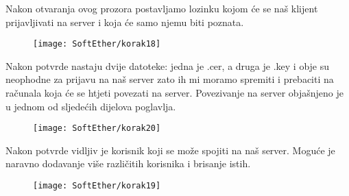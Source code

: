 \FloatBarrier
Nakon otvaranja ovog prozora postavljamo lozinku kojom će se naš klijent prijavljivati na server i koja će samo njemu biti poznata.
\begin{figure}[h!]
     \centering
     \texttt{[image: SoftEther/korak18]}
\end{figure}
\FloatBarrier
Nakon potvrde nastaju dvije datoteke: jedna je .cer, a druga je .key i obje su neophodne za prijavu na naš server zato ih mi moramo spremiti i prebaciti na računala koja će se htjeti povezati na server. Povezivanje na server objašnjeno je u jednom od sljedećih dijelova poglavlja.
\begin{figure}[h!]
     \centering
     \texttt{[image: SoftEther/korak20]}
\end{figure}
\FloatBarrier
Nakon potvrde vidljiv je korisnik koji se može spojiti na naš server. Moguće je naravno dodavanje više različitih korisnika i brisanje istih.
\begin{figure}[h!]
     \centering
     \texttt{[image: SoftEther/korak19]}
\end{figure}
\FloatBarrier

\newpage
